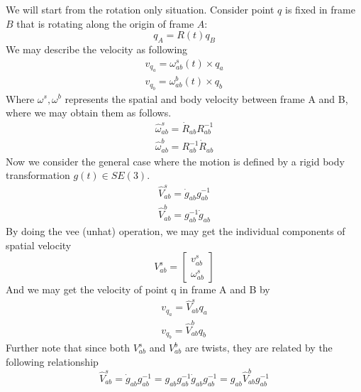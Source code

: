 \documentclass[letterpaper]{article}
\begin{document}
We will start from the rotation only situation. Consider point $q$ is fixed in
frame $B$ that is rotating along the origin of frame $A$:
\begin{equation*}
  q_A = R(t)q_B
\end{equation*}
We may describe the velocity as following
\begin{equation*}
  \begin{split}
    v_{q_a} = \omega^{s}_{ab}(t) \times q_a\\
    v_{q_b} = \omega^{b}_{ab}(t) \times q_b
  \end{split}
\end{equation*}
Where $\omega^{s}, \omega^{b}$ represents the spatial and body velocity between
frame A and B, where we may obtain them as follows.
\begin{equation*}
  \begin{split}
    \widehat{\omega}^{s}_{ab} = \dot{R}_{ab}R^{-1}_{ab}\\
    \widehat{\omega}^{b}_{ab} = R^{-1}_{ab}\dot{R}_{ab}
  \end{split}
\end{equation*}
Now we consider the general case where the motion is defined by a rigid body
transformation $g(t) \in SE(3)$. 
\begin{equation*}
  \begin{split}
    \widehat{V}^s_{ab} = \dot{g}_{ab}g^{-1}_{ab}\\
    \widehat{V}^b_{ab} = g^{-1}_{ab}\dot{g}_{ab}
  \end{split}
\end{equation*}
By doing the vee (unhat) operation, we may get the individual components of
spatial velocity
\begin{equation*}
  V^s_{ab} = \begin{bmatrix}
    v^s_{ab}\\\omega^s_{ab}
  \end{bmatrix}
\end{equation*}
And we may get the velocity of point q in frame A and B by
\begin{equation*}
  \begin{split}
    v_{q_a} = \widehat{V}^s_{ab}q_a\\
    v_{q_b} = \widehat{V}^b_{ab}q_b
  \end{split}
\end{equation*}
Further note that since both $V^{s}_{ab}$ and $V^{b}_{ab}$ are twists, 
they are related by the following relationship
\begin{equation*}
  \widehat{V}^s_{ab} = \dot{g}_{ab}g^{-1}_{ab} = g_{ab}g^{-1}_{ab}\dot{g}_{ab}g^{-1}_{ab} = g_{ab}\widehat{V}^{b}_{ab}g^{-1}_{ab}
\end{equation*}
\end{document}
